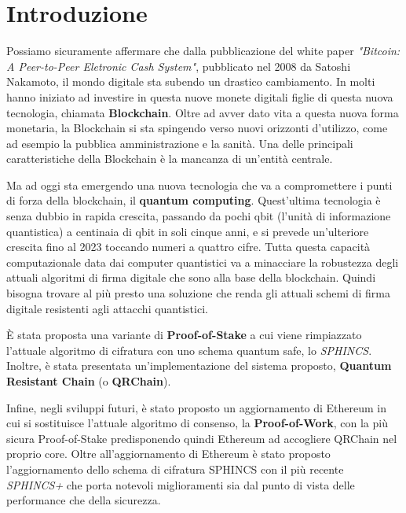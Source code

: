 \chapter*{Introduzione}
Possiamo sicuramente affermare che dalla pubblicazione del white paper \textit{"Bitcoin: A Peer-to-Peer Eletronic Cash System"}, pubblicato nel 2008 da Satoshi Nakamoto, il mondo digitale sta subendo un drastico cambiamento. In molti hanno iniziato ad investire in questa nuove monete digitali figlie di questa nuova tecnologia, chiamata \textbf{Blockchain}. Oltre ad avver dato vita a questa nuova forma monetaria, la Blockchain si sta spingendo verso nuovi orizzonti d'utilizzo, come ad esempio la pubblica amministrazione e la sanità. Una delle principali caratteristiche della Blockchain è la mancanza di un'entità centrale.

Ma ad oggi sta emergendo una nuova tecnologia che va a compromettere i punti di forza della blockchain, il \textbf{quantum computing}. Quest'ultima tecnologia è senza dubbio in rapida crescita, passando da pochi qbit (l'unità di informazione quantistica) a centinaia di qbit in soli cinque anni, e si prevede un'ulteriore crescita fino al 2023 toccando numeri a quattro cifre. Tutta questa capacità computazionale data dai computer quantistici va a minacciare la robustezza degli attuali algoritmi di firma digitale che sono alla base della blockchain. Quindi bisogna trovare al più presto una soluzione che renda gli attuali schemi di firma digitale resistenti agli attacchi quantistici.

È stata proposta una variante di \textbf{Proof-of-Stake} a cui viene rimpiazzato l'attuale algoritmo di cifratura con uno schema quantum safe, lo \textit{SPHINCS}. Inoltre, è stata presentata un'implementazione del sistema proposto, \textbf{Quantum Resistant Chain} (o \textbf{QRChain}).

Infine, negli sviluppi futuri, è stato proposto un aggiornamento di Ethereum in cui si sostituisce l'attuale algoritmo di consenso, la \textbf{Proof-of-Work}, con la più sicura Proof-of-Stake predisponendo quindi Ethereum ad accogliere QRChain nel proprio core. Oltre all'aggiornamento di Ethereum è stato proposto l'aggiornamento dello schema di cifratura SPHINCS con il più recente \textit{SPHINCS+} che porta notevoli miglioramenti sia dal punto di vista delle performance che della sicurezza.

